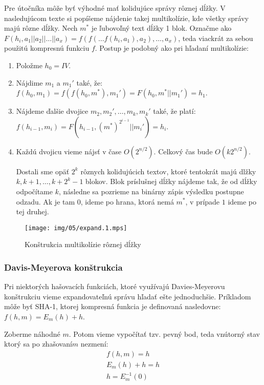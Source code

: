 Pre útočníka môže byť výhodné mať kolidujúce správy rôznej dĺžky. 
V nasledujúcom texte si popíšeme nájdenie takej multikolízie,
kde všetky správy majú rôzne dĺžky. Nech $m^*$ je ľubovoľný
text dĺžky 1 blok.
Označme ako $F(h_i, a_1||a_2||\dots||a_x) = 
    f(f(\dots f(h_i, a_1), a_2), \dots, a_x)$,
teda viackrát za sebou použitú kompresnú funkciu $f$.
Postup je podobný ako pri hľadaní multikolízie:
\begin{enumerate}
    \itemsep -1.2mm

    \item Položme $h_0 = IV$.

    \item Nájdime $m_1$ a $m_1'$ také, že: 
        $f(h_0, m_1) = f(f(h_0, m^*), m_1') = F(h_0, m^*||m_1') = h_1$. 

    \item Nájdeme ďalšie dvojice $m_2, m_2', \dots, m_k, m_k'$ také, že platí:
        $f(h_{i-1}, m_i) = F(h_{i-1}, (m^*)^{2^{i-1}}||m_i') = h_i$.

    \item Každú dvojicu vieme nájsť v čase $O(2^{n/2})$.
        Celkový čas bude $O(k 2^{n/2})$.
        
        Dostali sme opäť $2^k$ rôznych kolidujúcich textov, ktoré tentokrát 
        majú dlžky $k, k+1, \dots, k+2^k-1$ blokov. 
        Blok príslušnej dĺžky nájdeme tak, že od dĺžky odpočítame $k$, následne
        sa pozrieme na binárny zápis výsledku postupne odzadu.
        Ak je tam $0$, ideme po hrana, ktorá nemá $m^*$,
        v prípade $1$ ideme po tej druhej.
\end{enumerate}

\begin{figure}[h!]
    \centering
    \texttt{[image: img/05/expand.1.mps]}
    \caption{Konštrukcia multikolízie rôznej dĺžky}
    \label{fig:expand1}
\end{figure}

\subsubsection{Davis-Meyerova konštrukcia}

Pri niektorých hašovacích funkciách, ktoré využívajú
Davies-Meyerovu konštrukciu vieme expandovateľnú správu hľadať
ešte jednoduchšie. Príkladom môže byť SHA-1, ktorej kompresná funkcia
je definovaná nasledovne:
$f(h, m) = E_m(h)+h$.

Zoberme náhodné $m$. Potom vieme vypočítať tzv. pevný bod, teda vnútorný
stav ktorý sa po \clqq zhašovaní\crqq $m$ nezmení:
\begin{align*}
    f(h,m) = h \\
    E_m(h) + h= h \\
    h = E_m^{-1}(0)
\end{align*}

